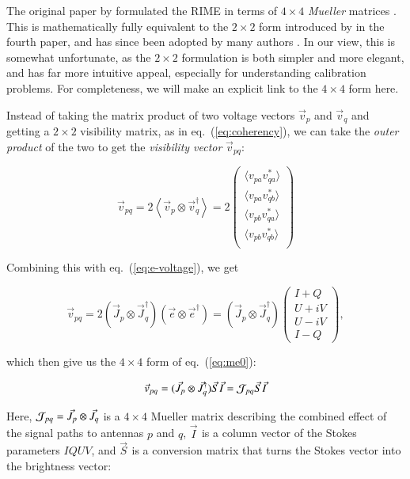 \documentclass[]{aa}
\newcommand{\jones}[2]{\vec {#1}_{#2}}
\newcommand{\jonesT}[2]{\vec {#1}^\dagger_{#2}}
\begin{document}
The original paper by \citet{ME1} formulated the RIME in terms of $4\times4$ {\em Mueller} matrices \citep{Muller}. This is mathematically fully equivalent to the $2\times2$ form introduced by \citet{ME4} in the fourth paper, and has since been adopted by many authors \citep{JEN:note185,tms,SB:imageplane,Rau:DDEs}. In our view, this is somewhat unfortunate, as the $2\times2$ formulation is both simpler and more elegant, and has far more intuitive appeal, especially for understanding calibration problems. For completeness, we will make an explicit link to the $4\times4$ form here.

Instead of taking the matrix product of two voltage vectors $\vec v_p$ and $\vec v_q$ and getting a $2\times2$ visibility matrix, as in eq.~(\ref{eq:coherency}), we can take the {\em outer product} of the two to get the {\em visibility vector} $\vec v_{pq}$:

\[
\vec v_{pq} = 2 \left< \vec v_p \otimes \vec v^\dagger_q \right > = 2 \left ( 
\begin{array}{c}
    \langle v_{pa}v^*_{qa}\rangle \\ \langle v_{pa}v^*_{qb}\rangle \\
    \langle v_{pb}v^*_{qa}\rangle \\ \langle v_{pb}v^*_{qb}\rangle \\
\end{array} 
\right ) 
\]

Combining this with eq.~(\ref{eq:e-voltage}), we get

\[
    \vec v_{pq} = 2 ( \jones{J}{p} \otimes \jonesT{J}{q} ) (\vec e \otimes \vec e^\dagger )
 = ( \jones{J}{p} \otimes \jonesT{J}{q} ) 
\left ( \begin{array}{c}
I+Q \\ U+iV \\ U-iV \\ I-Q
\end{array} \right ), 
\]

which then give us the $4\times4$ form of eq.~(\ref{eq:me0}):

    \begin{equation}\label{eq:me:mueller}
    \vec v_{pq} = ( \jones{J}{p} \otimes \jonesT{J}{q} ) \jones{S}{} \jones{I}{} = {\cal J}_{pq} \jones{S}{} \jones{I}{}
    \end{equation}

Here, ${\cal J}_{pq}=\jones{J}{p} \otimes \jones{J}{q}$ is a $4\times4$ Mueller matrix describing the combined effect of the signal paths to antennas $p$ and $q$, $\jones{I}{}$ is a column vector of the Stokes parameters $IQUV$, and $\jones{S}{}$ is a conversion matrix that turns the Stokes vector into the brightness vector:
\end{document}
